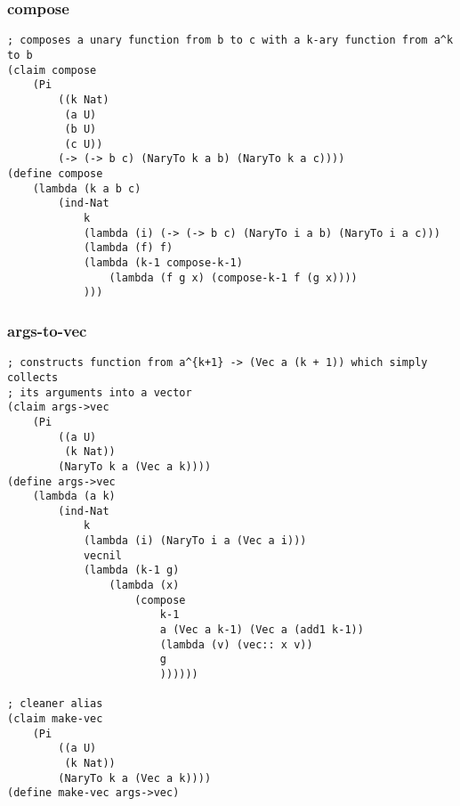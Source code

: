 \subsubsection{compose} \label{code:compose}
\begin{verbatim}
; composes a unary function from b to c with a k-ary function from a^k to b
(claim compose
    (Pi 
        ((k Nat)
         (a U)
         (b U)
         (c U))
        (-> (-> b c) (NaryTo k a b) (NaryTo k a c))))
(define compose
    (lambda (k a b c)
        (ind-Nat
            k
            (lambda (i) (-> (-> b c) (NaryTo i a b) (NaryTo i a c)))
            (lambda (f) f)
            (lambda (k-1 compose-k-1)
                (lambda (f g x) (compose-k-1 f (g x))))
            )))
\end{verbatim}

\subsubsection{args-to-vec} \label{code:args-to-vec}
\begin{verbatim}
; constructs function from a^{k+1} -> (Vec a (k + 1)) which simply collects 
; its arguments into a vector
(claim args->vec
    (Pi 
        ((a U) 
         (k Nat)) 
        (NaryTo k a (Vec a k))))
(define args->vec
    (lambda (a k)
        (ind-Nat
            k
            (lambda (i) (NaryTo i a (Vec a i)))
            vecnil
            (lambda (k-1 g)
                (lambda (x)
                    (compose
                        k-1
                        a (Vec a k-1) (Vec a (add1 k-1))
                        (lambda (v) (vec:: x v))
                        g
                        ))))))

; cleaner alias
(claim make-vec
    (Pi 
        ((a U) 
         (k Nat)) 
        (NaryTo k a (Vec a k))))
(define make-vec args->vec)
\end{verbatim}

